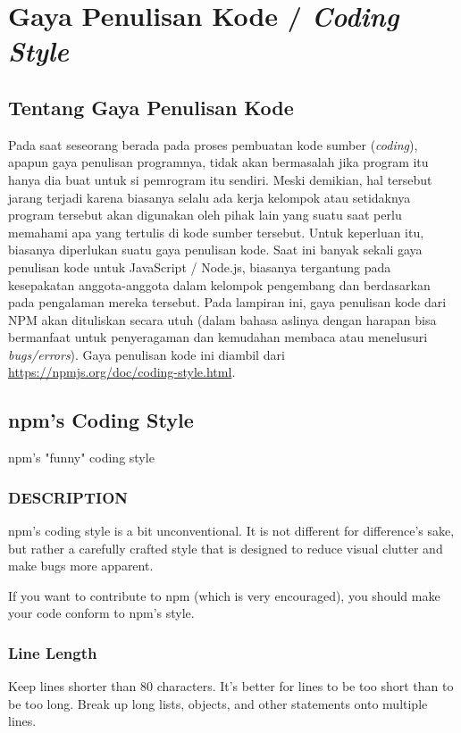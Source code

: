 \chapter{Gaya Penulisan Kode / \textit{Coding Style}}

\section{Tentang Gaya Penulisan Kode}

Pada saat seseorang berada pada proses pembuatan kode sumber (\textit{coding}), apapun gaya penulisan programnya, tidak akan bermasalah jika program itu hanya dia buat untuk si pemrogram itu sendiri. Meski demikian, hal tersebut jarang terjadi karena biasanya selalu ada kerja kelompok atau setidaknya program tersebut akan digunakan oleh pihak lain yang suatu saat perlu memahami apa yang tertulis di kode sumber tersebut. Untuk keperluan itu, biasanya diperlukan suatu gaya penulisan kode. Saat ini banyak sekali gaya penulisan kode untuk JavaScript / Node.js, biasanya tergantung pada kesepakatan anggota-anggota dalam kelompok pengembang dan berdasarkan pada pengalaman mereka tersebut. Pada lampiran ini, gaya penulisan kode dari NPM akan dituliskan secara utuh (dalam bahasa aslinya dengan harapan bisa bermanfaat untuk penyeragaman dan kemudahan membaca atau menelusuri \textit{bugs/errors}). Gaya penulisan kode ini diambil dari \url{https://npmjs.org/doc/coding-style.html}.

\section{npm's Coding Style}

npm's "funny" coding style

\subsection{DESCRIPTION}
npm's coding style is a bit unconventional. It is not different for difference's sake, but rather a carefully crafted style that is designed to reduce visual clutter and make bugs more apparent.

If you want to contribute to npm (which is very encouraged), you should make your code conform to npm's style.

\subsection{Line Length}
Keep lines shorter than 80 characters. It's better for lines to be too short than to be too long. Break up long lists, objects, and other statements onto multiple lines.

